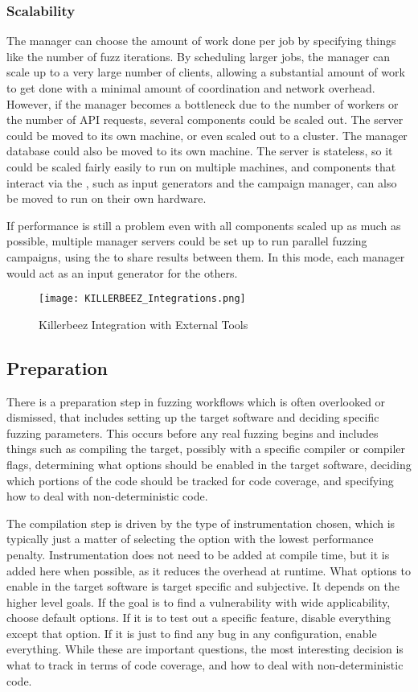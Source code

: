 \subsubsection{Scalability}
The manager can choose the amount of work done per job by specifying things like the
number of fuzz iterations. By scheduling larger jobs, the manager can scale up to a very large number
of clients, allowing a substantial amount of
work to get done with a minimal amount of coordination and network overhead.
However, if the manager becomes a bottleneck due to the number of workers or
the number of API requests, several components could be scaled
out. The \BOINC{} server could be moved to its own machine, or even scaled out
to a cluster.\cite{boincmultihost} The manager database could also be moved to
its own machine. The \REST{} \API{} server is stateless, so it could be scaled
fairly easily to run on multiple machines, and components that interact via the
\REST{} \API{}, such as input generators and the campaign manager, can also be
moved to run on their own hardware.

If performance is still a problem even with
all components scaled up as much as possible, multiple manager servers could be
set up to run parallel fuzzing campaigns, using the \REST{} \API{} to share
results between them. In this mode, each manager would act as an input generator
for the others.

\begin{figure*}[!ht]
\centering
\texttt{[image: KILLERBEEZ\_Integrations.png]}
\caption{Killerbeez Integration with External Tools}
\label{fig:Killerbeez-integrations}
\end{figure*}


\subsection{Preparation}  \label{Preparation Overview}
There is a preparation step in fuzzing workflows which is often overlooked or
dismissed, that includes setting up the target software and deciding specific
fuzzing parameters. This occurs before any real fuzzing begins and includes
things such as compiling the target, possibly with a specific compiler or
compiler flags, determining what options should be enabled in the target
software, deciding which portions of the code should be tracked for code
coverage, and specifying how to deal with non-deterministic code.

The compilation step is driven by the type of instrumentation chosen,
which is typically just a matter of selecting the option with the lowest
performance penalty. Instrumentation does not need to be added at compile
time, but it is added here when possible, as it reduces the overhead at runtime.
What options to enable in the target software is target specific and
subjective.  It depends on the higher level goals.  If the goal is to find a
vulnerability with wide applicability, choose default options. If it is to test
out a specific feature, disable everything except that option. If it is just to
find any bug in any configuration, enable everything.  While these are
important questions, the most interesting decision is what to track in terms of
code coverage, and how to deal with non-deterministic code.

